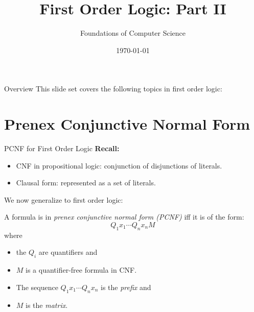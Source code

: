 \documentclass[style=sailor,size=12pt]{powerdot}
\title{First Order Logic: Part II}
\author{Foundations of Computer Science}
\date{\today}
\begin{document}
\maketitle
\begin{slide}[toc=,bm=]{Overview}
This slide set covers the following topics in first order logic:

\vspace{5mm}
\tableofcontents[content=sections]
\end{slide}
\section[]{Prenex Conjunctive Normal Form}

\begin{wideslide}[bm=,toc=]{PCNF for First Order Logic}
{\bf Recall:}
\begin{itemize}
\item CNF in propositional logic: conjunction of disjunctions of literals.
\item Clausal form: represented as a set of literals.
\end{itemize}
\pause
We now generalize to first order logic:
\begin{defn}{9.9}
A formula is in \emph{prenex conjunctive normal form (PCNF)} iff it is of the
form:
\pause
\[
  Q_1x_1\cdots Q_n x_n M
  \]
\pause
  where 
  \begin{itemize}
  \item<5-> the $Q_i$ are quantifiers and 
  \item<6-> $M$ is a quantifier-free formula in CNF.
  \item<7-> The sequence $Q_1x_1 \cdots Q_n x_n$ is the \emph{prefix} and 
  \item<8-> $M$ is the \emph{matrix}.
  \end{itemize}
\end{defn}

\end{wideslide}
\end{document}
